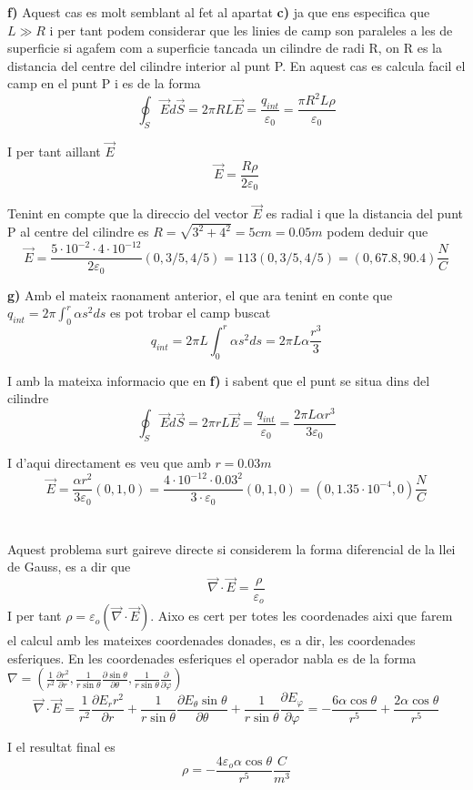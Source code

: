\documentclass[12pt, a4papre]{article}
\begin{document}
	\textbf{f)} Aquest cas es molt semblant al fet al apartat \textbf{c)} ja que ens especifica que $L \gg R$ i per tant podem considerar que les linies de camp son paraleles a les de superficie si agafem com a superficie tancada un cilindre de radi R, on R es la distancia del centre del cilindre interior al punt P. En aquest cas es calcula facil el camp en el punt P i es de la forma
	\[
	\oint_S\vec{E}d\vec{S} = 2\pi RL \vec{E} = \frac{q_{int}}{\varepsilon_0} = \frac{\pi R^2L\rho}{\varepsilon_0}
	\]
	
	I per tant aillant $\vec{E}$
	\[
	\vec{E} = \frac{R\rho}{2\varepsilon_0}
	\]
	
	Tenint en compte que la direccio del vector $\vec{E}$ es radial i que la distancia del punt P al centre del cilindre es $R=\sqrt{3^2 + 4^2} = 5cm = 0.05m$ podem deduir que 
	\[
	\vec{E} = \frac{5\cdot 10^{-2} \cdot 4\cdot10^{-12}}{2\varepsilon_0} (0, 3/5, 4/5)= 113(0, 3/5, 4/5) = (0, 67.8, 90.4) \frac{N}{C}
	\]

	\newpage
	\textbf{g)} Amb el mateix raonament anterior, el que ara tenint en conte que $q_{int} = 2\pi\int_0^r\alpha s^2 ds$ es pot trobar el camp buscat
	\[
	q_{int} = 2\pi L\int_0^r\alpha s^2 ds = 2\pi L\alpha\frac{r^3}{3}
	\]
	
	I amb la mateixa informacio que en \textbf{f)} i sabent que el punt se situa dins del cilindre
	\[
	\oint_S\vec{E}d\vec{S} = 2\pi rL \vec{E} = \frac{q_{int}}{\varepsilon_0} = \frac{2\pi L\alpha r^3}{3\varepsilon_0}
	\]
	
	I d'aqui directament es veu que amb $r = 0.03m$
	\[
	\vec{E} = \frac{\alpha r^2}{3\varepsilon_0}(0, 1, 0) = \frac{4\cdot 10^{-12} \cdot 0.03^2}{3\cdot \varepsilon_0}(0, 1, 0) = (0, 1.35\cdot 10^{-4}, 0) \frac{N}{C}
	\]
	
	\section{}
	
	Aquest problema surt gaireve directe si considerem la forma diferencial de la llei de Gauss, es a dir que
	\[
	\vec{\nabla} \cdot \vec{E}=\frac{\rho}{\varepsilon_o}
	\]
	I per tant $\rho = \varepsilon_o (\vec{\nabla} \cdot \vec{E})$. Aixo es cert per totes les coordenades aixi que farem el calcul amb les mateixes coordenades donades, es a dir, les coordenades esferiques. En les coordenades esferiques el operador nabla es de la forma $\nabla = (\frac{1}{r^2}\frac{\partial r^2}{\partial r}, \frac{1}{r\sin{\theta}}\frac{\partial \sin{\theta}}{\partial \theta},\frac{1}{r\sin{\theta}} \frac{\partial}{\partial \varphi})$
	\[
	\vec{\nabla} \cdot \vec{E} = \frac{1}{r^2}\frac{\partial E_r r^2}{\partial r} +  \frac{1}{r\sin{\theta}} \frac{\partial E_{\theta}\sin{\theta}}{\partial \theta} +  \frac{1}{r\sin{\theta}} \frac{\partial E_{\varphi}}{\partial \varphi} = -\frac{6\alpha \cos{\theta}}{r^5} + \frac{2\alpha \cos{\theta}}{r^5}
	\]
	
	I el resultat final es 
	\[
	\rho = -\frac{4\varepsilon_o\alpha \cos{\theta}}{r^5}	\frac{C}{m^3}
	\]

	
	
	
\end{document}
